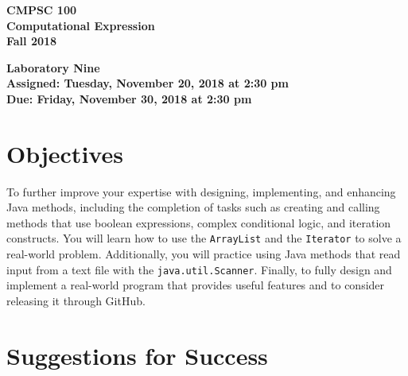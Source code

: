 \documentclass[11pt]{article}
\newcommand{\assignmentduedate}{November 30}
\newcommand{\assignmentassignedate}{November 20}
\newcommand{\assignmentnumber}{Nine}
\newcommand{\labyear}{2018}
\newcommand{\labday}{Tuesday}
\newcommand{\labdueday}{Friday}
\newcommand{\labtime}{2:30 pm}
\newcommand{\assigneddate}{Assigned: \labday, \assignmentassignedate, \labyear{} at \labtime{}}
\newcommand{\duedate}{Due: \labdueday, \assignmentduedate, \labyear{} at \labtime{}}
\newcommand{\program}[1]{\lstinline{#1}}
\newcommand{\labtitle}[1]
{
  \begin{center}
    \begin{center}
      \bf
      CMPSC 100\\Computational Expression\\
      Fall 2018\\
      \medskip
    \end{center}
    \bf
    #1
  \end{center}
}
\begin{document}
\thispagestyle{empty}

\labtitle{Laboratory \assignmentnumber{} \\ \assigneddate{} \\ \duedate{}}

\section*{Objectives}

To further improve your expertise with designing, implementing, and enhancing
Java methods, including the completion of tasks such as creating and calling
methods that use boolean expressions, complex conditional logic, and iteration
constructs. You will learn how to use the \program{ArrayList} and the
\program{Iterator} to solve a real-world problem. Additionally, you will
practice using Java methods that read input from a text file with the
\program{java.util.Scanner}. Finally, to fully design and implement a real-world
program that provides useful features and to consider releasing it through
GitHub.



\section*{Suggestions for Success}
\end{document}
